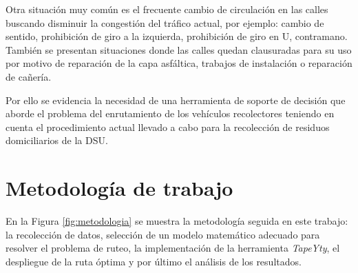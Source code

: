 Otra situación muy común es el frecuente cambio de circulación en las calles buscando disminuir la congestión del tráfico actual, por ejemplo: cambio de sentido, prohibición de giro a la izquierda, prohibición de giro en U, contramano. También se presentan situaciones donde las calles quedan clausuradas para su uso por motivo de reparación de la capa asfáltica, trabajos de instalación o reparación de cañería.

Por ello se evidencia la necesidad de una herramienta de soporte de decisión que aborde el problema del enrutamiento de los vehículos recolectores teniendo en cuenta el procedimiento actual llevado a cabo para la recolección de residuos domiciliarios de la DSU.



\section{Metodología de trabajo}

En la Figura \ref{fig:metodologia} se muestra la metodología seguida en este trabajo: la recolección de datos, selección de un modelo matemático adecuado para resolver el problema de ruteo, la implementación de la herramienta \textit{TapeYty}, el despliegue de la ruta óptima y por último el análisis de los resultados.

